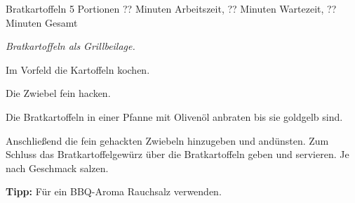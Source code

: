 \begin{recipe}{Bratkartoffeln} {5 Portionen} {?? Minuten Arbeitszeit, ?? Minuten Wartezeit, ?? Minuten Gesamt}

  \freeform{}\textit{Bratkartoffeln als Grillbeilage.}


  Im Vorfeld die Kartoffeln kochen.


  Die Zwiebel fein hacken.


  Die Bratkartoffeln in einer Pfanne mit Olivenöl anbraten bis sie goldgelb sind.


  Anschließend die fein gehackten Zwiebeln hinzugeben und andünsten.
  Zum Schluss das Bratkartoffelgewürz über die Bratkartoffeln geben und servieren.
  Je nach Geschmack salzen.

  \freeform{}\hrulefill{}

  \freeform{}\textbf{Tipp:}
  Für ein BBQ-Aroma Rauchsalz verwenden.

\end{recipe}
